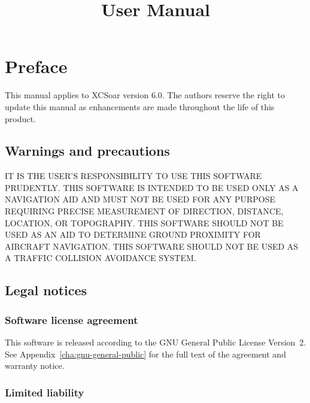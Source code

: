 \documentclass[a4paper,12pt]{refrep}
\title{User Manual}
\begin{document}
\maketitle

\listoftodos



  
\begingroup
\setlength{\parskip}{0.1\baselineskip}
\tableofcontents
\endgroup


\chapter*{Preface}

This manual applies to XCSoar version 6.0.  The authors reserve the
right to update this manual as enhancements are made throughout the
life of this product.

\section*{Warnings and precautions}

\warning IT IS THE USER'S RESPONSIBILITY TO USE THIS SOFT\-WARE PRUDENTLY. THIS SOFTWARE IS 
INTENDED TO BE USED ONLY AS A NAVIGATION AID AND MUST NOT BE USED FOR ANY PURPOSE REQUIRING 
PRECISE MEASURE\-MENT OF DIRECTION, DISTANCE, LOCATION, OR TOPO\-GRAPHY. THIS SOFTWARE SHOULD 
NOT BE USED AS AN AID TO DETERMINE GROUND PROXIMITY FOR AIRCRAFT NAVIGATION. THIS SOFTWARE 
SHOULD NOT BE USED AS A TRAFFIC COLLISION AVOIDANCE SYSTEM.


\section*{Legal notices}

\subsection*{Software license agreement}

This software is released according to the GNU General Public License
Version~2.  See Appendix~\ref{cha:gnu-general-public} for the full
text of the agreement and warranty notice.

\subsection*{Limited liability}
\end{document}
